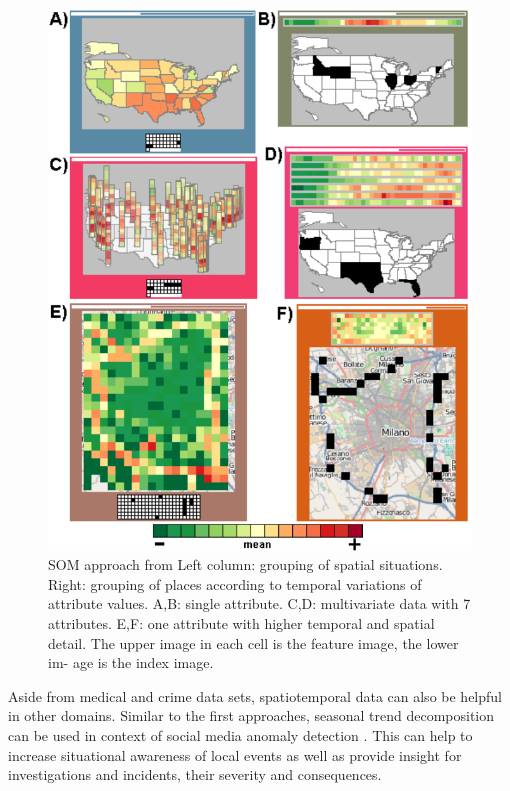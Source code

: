 \documentclass[electronic]{vgtc}             %
\begin{document}
\begin{figure}[htb]
	\centering
	\includegraphics[width=\columnwidth]{SOM}
	\caption{SOM approach from \cite{Andrienko:2010:Space}
		Left column: grouping of spatial situations.
		Right: grouping of places according to temporal variations of attribute values.
		A,B: single attribute. 
		C,D: multivariate data with 7 attributes. 
		E,F: one attribute with higher temporal and spatial detail. 
		The	upper image in each cell is the feature image, the lower im-
		age is the index image.
	}
	\label{fig:som}
\end{figure}

Aside from medical and crime data sets, spatiotemporal data can also be helpful in other domains. 
Similar to the first approaches, seasonal trend decomposition can be used in context of social media anomaly detection \cite{Chae:2012, Thom:2012}. 
This can help to increase situational awareness of local events as well as provide insight for investigations and incidents, their severity and consequences.
\end{document}
